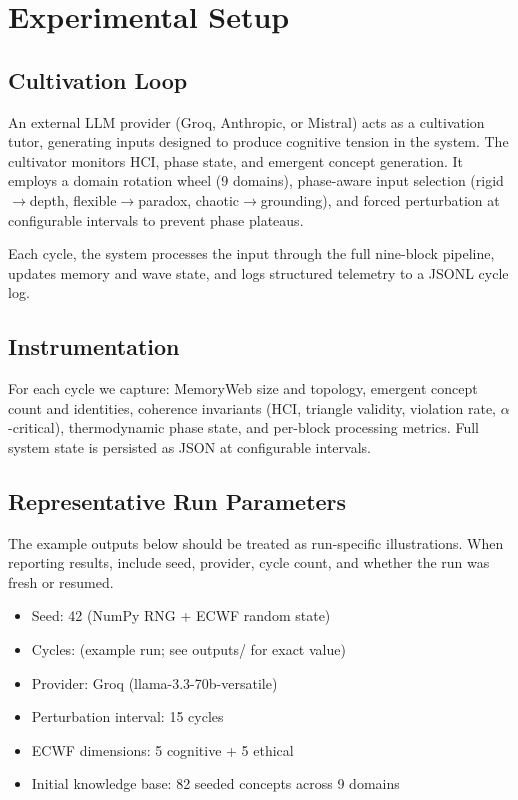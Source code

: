\documentclass[11pt,a4paper]{article}
\begin{document}
\section{Experimental Setup}

\subsection{Cultivation Loop}

An external LLM provider (Groq, Anthropic, or Mistral) acts as a cultivation 
tutor, generating inputs designed to produce cognitive tension in the system. 
The cultivator monitors HCI, phase state, and emergent concept generation. It 
employs a domain rotation wheel (9 domains), phase-aware input selection 
(rigid$\to$depth, flexible$\to$paradox, chaotic$\to$grounding), and forced 
perturbation at configurable intervals to prevent phase plateaus.

Each cycle, the system processes the input through the full nine-block 
pipeline, updates memory and wave state, and logs structured telemetry 
to a JSONL cycle log.

\subsection{Instrumentation}

For each cycle we capture: MemoryWeb size and topology, emergent concept 
count and identities, coherence invariants (HCI, triangle validity, violation 
rate, $\alpha$-critical), thermodynamic phase state, and per-block processing 
metrics. Full system state is persisted as JSON at configurable intervals.

\subsection{Representative Run Parameters}

The example outputs below should be treated as run-specific illustrations.
When reporting results, include seed, provider, cycle count, and whether the run
was fresh or resumed.

\begin{itemize}[nosep]
    \item Seed: 42 (NumPy RNG + ECWF random state)
    \item Cycles: (example run; see outputs/ for exact value)
    \item Provider: Groq (llama-3.3-70b-versatile)
    \item Perturbation interval: 15 cycles
    \item ECWF dimensions: 5 cognitive + 5 ethical
    \item Initial knowledge base: 82 seeded concepts across 9 domains
\end{itemize}
\end{document}
